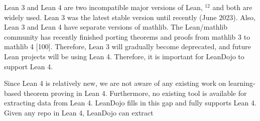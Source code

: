 \documentclass[
]{article}
\begin{document}
Lean 3 and Lean 4 are two incompatible major versions of Lean, \(^{12}\)
and both are widely used. Lean 3 was the latest stable version until
recently (June 2023). Also, Lean 3 and Lean 4 have separate versions of
mathlib. The Lean/mathlib community has recently finished porting
theorems and proofs from mathlib 3 to mathlib 4 {[}100{]}. Therefore,
Lean 3 will gradually become deprecated, and future Lean projects will
be using Lean 4. Therefore, it is important for LeanDojo to support Lean
4.

Since Lean 4 is relatively new, we are not aware of any existing work on
learning-based theorem proving in Lean 4. Furthermore, no existing tool
is available for extracting data from Lean 4. LeanDojo fills in this gap
and fully supports Lean 4. Given any repo in Lean 4, LeanDojo can
extract
\end{document}
